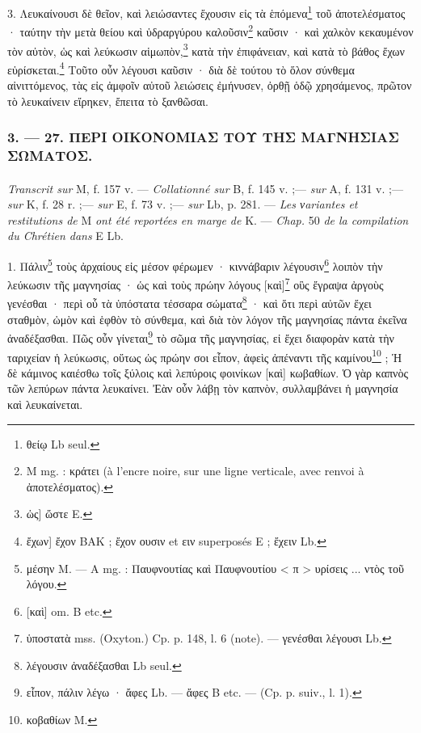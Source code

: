 \documentclass[landscape, a4paper, 11pt, oneside, polutonikogreek, french]{article}
\begin{document}
3. Λευκαίνουσι δὲ θεῖον, καὶ λειώσαντες ἔχουσιν εἰς τὰ ἑπόμενα\footnote{θείῳ Lb seul.} τοῦ ἀποτελέσματος · ταύτην τὴν μετὰ θείου καὶ ὑδραργύρου καλοῦσιν\footnote{M mg. : κράτει (à l'encre noire, sur une ligne verticale, avec renvoi à ἀποτελέσματος).} καῦσιν · καὶ χαλκὸν κεκαυμένον τὸν αὐτὸν, ὡς καὶ λεύκωσιν αἱμωπὸν,\footnote{ὡς] ὥστε E.} κατὰ τὴν ἐπιφάνειαν, καὶ κατὰ τὸ βάθος ἔχων εὑρίσκεται.\footnote{ἔχων] ἔχον BAK ; ἔχον ουσιν et ειν superposés E ; ἔχειν Lb.} Τοῦτο οὖν λέγουσι καῦσιν · διὰ δὲ τούτου τὸ ὅλον σύνθεμα αἰνιττόμενος, τὰς εἰς ἀμφοῖν αὐτοῦ λειώσεις ἐμήνυσεν, ὀρθῇ ὁδῷ χρησάμενος, πρῶτον τὸ λευκαίνειν εἴρηκεν, ἔπειτα τὸ ξανθῶσαι.

\bigskip
\centerline{\EightStarTaper}
\centerline{\EightStarTaper\EightStarTaper}
\bigskip

\subsubsection{3. --- 27. ΠΕΡΙ ΟΙΚΟΝΟΜΙΑΣ ΤΟΥ ΤΗΣ ΜΑΓΝΗΣΙΑΣ ΣΩΜΑΤΟΣ.}
\paragraph{}
\emph{Transcrit sur} M, f. 157 v. --- \emph{Collationné sur} B, f. 145 v. ;--- \emph{sur} A, f. 131 v. ;--- \emph{sur} K, f. 28 r. ;--- \emph{sur} E, f. 73 v. ;--- \emph{sur} Lb, p. 281. --- \emph{Les νariantes et restitutions de} M \emph{ont été reportées en marge de} K. --- \emph{Chap.} 50 \emph{de la compilation du Chrétien dans} E Lb.

\bigskip

1. Πάλιν\footnote{μέσην M. --- A mg. : Παυφνουτίας καὶ Παυφνουτίου < π > υρίσεις ... ντὸς τοῦ λόγου.} τοὺς ἀρχαίους εἰς μέσον φέρωμεν · κιννάβαριν λέγουσιν\footnote{[καὶ] om. B etc.} λοιπὸν τὴν λεύκωσιν τῆς μαγνησίας · ὡς καὶ τοὺς πρώην λόγους [καὶ]\footnote{ὑποστατὰ mss. (Oxyton.) Cp. p. 148, l. 6 (note). --- γενέσθαι λέγουσι Lb.} οὓς ἔγραψα ἀργοὺς γενέσθαι · περὶ οὗ τὰ ὑπόστατα τέσσαρα σώματα\footnote{λέγουσιν ἀναδέξασθαι Lb seul.} · καὶ ὅτι περὶ αὐτῶν ἔχει σταθμὸν, ὠμὸν καὶ ἑφθὸν τὸ σύνθεμα, καὶ διὰ τὸν λόγον τῆς μαγνησίας πάντα ἐκεῖνα ἀναδέξασθαι. Πῶς οὖν γίνεται\footnote{εἶπον, πάλιν λέγω · ἄφες Lb. --- ἄφες B etc. --- (Cp. p. suiv., l. 1).} τὸ σῶμα τῆς μαγνησίας, εἰ ἔχει διαφορὰν κατὰ τὴν ταριχείαν ἡ λεύκωσις, οὕτως ὡς πρώην σοι εἶπον, ἀφεὶς ἀπέναντι τῆς καμίνου\footnote{κοβαθίων M.} ; Ἡ δὲ κάμινος καιέσθω τοῖς ξύλοις καὶ λεπύροις φοινίκων [καὶ] κωβαθίων. Ὁ γὰρ καπνὸς τῶν λεπύρων πάντα λευκαίνει. Ἐὰν οὖν λάβῃ τὸν καπνὸν, συλλαμβάνει ἡ μαγνησία καὶ λευκαίνεται.
\end{document}
